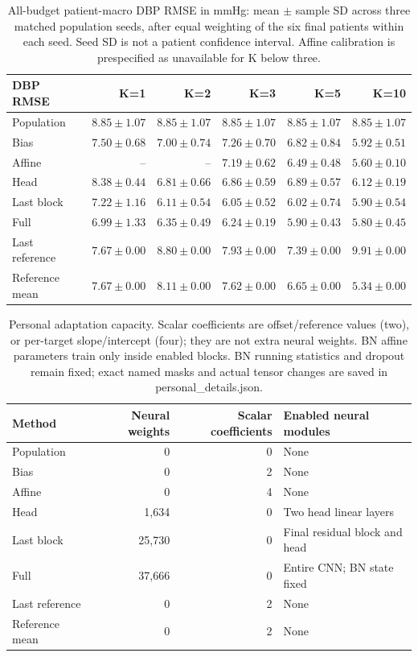 \documentclass[11pt]{article}
\begin{document}
\begin{table}[!htbp]\centering\small
\begin{tabular}{lrrrrr}\toprule
DBP RMSE & K=1 & K=2 & K=3 & K=5 & K=10\\\midrule
Population & $8.85\pm1.07$ & $8.85\pm1.07$ & $8.85\pm1.07$ & $8.85\pm1.07$ & $8.85\pm1.07$\\
Bias & $7.50\pm0.68$ & $7.00\pm0.74$ & $7.26\pm0.70$ & $6.82\pm0.84$ & $5.92\pm0.51$\\
Affine & -- & -- & $7.19\pm0.62$ & $6.49\pm0.48$ & $5.60\pm0.10$\\
Head & $8.38\pm0.44$ & $6.81\pm0.66$ & $6.86\pm0.59$ & $6.89\pm0.57$ & $6.12\pm0.19$\\
Last block & $7.22\pm1.16$ & $6.11\pm0.54$ & $6.05\pm0.52$ & $6.02\pm0.74$ & $5.90\pm0.54$\\
Full & $6.99\pm1.33$ & $6.35\pm0.49$ & $6.24\pm0.19$ & $5.90\pm0.43$ & $5.80\pm0.45$\\
Last reference & $7.67\pm0.00$ & $8.80\pm0.00$ & $7.93\pm0.00$ & $7.39\pm0.00$ & $9.91\pm0.00$\\
Reference mean & $7.67\pm0.00$ & $8.11\pm0.00$ & $7.62\pm0.00$ & $6.65\pm0.00$ & $5.34\pm0.00$\\
\bottomrule\end{tabular}
\caption{All-budget patient-macro DBP RMSE in mmHg: mean $\pm$ sample SD across three matched population seeds, after equal weighting of the six final patients within each seed. Seed SD is not a patient confidence interval. Affine calibration is prespecified as unavailable for K below three.}\end{table}

\begin{table}[!htbp]\centering\small
\begin{tabular}{lrrl}\toprule
Method & Neural weights & Scalar coefficients & Enabled neural modules\\\midrule
Population & 0 & 0 & None\\
Bias & 0 & 2 & None\\
Affine & 0 & 4 & None\\
Head & 1,634 & 0 & Two head linear layers\\
Last block & 25,730 & 0 & Final residual block and head\\
Full & 37,666 & 0 & Entire CNN; BN state fixed\\
Last reference & 0 & 2 & None\\
Reference mean & 0 & 2 & None\\
\bottomrule\end{tabular}
\caption{Personal adaptation capacity. Scalar coefficients are offset/reference values (two), or per-target slope/intercept (four); they are not extra neural weights. BN affine parameters train only inside enabled blocks. BN running statistics and dropout remain fixed; exact named masks and actual tensor changes are saved in personal\_details.json.}\end{table}
\end{document}
